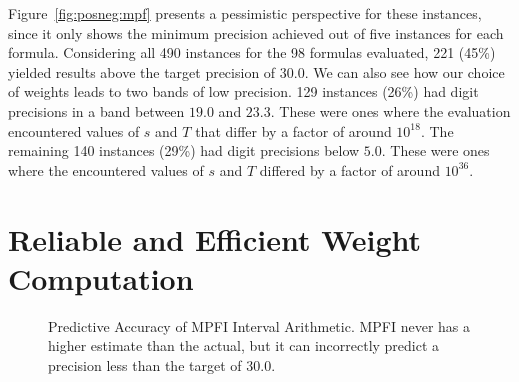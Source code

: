 \documentclass[letterpaper,USenglish,cleveref, autoref, thm-restate]{lipics-v2021}
\begin{document}
Figure~\ref{fig:posneg:mpf} presents a pessimistic
perspective for these instances, since it only shows the minimum
precision achieved out of five instances for each formula.  Considering all 490 instances
for the 98 formulas evaluated, 221 (45\%) yielded results above the
target precision of $30.0$.  We can also see how our choice of weights
leads to two bands of low precision.  129 instances (26\%) had digit
precisions in a band between $19.0$ and $23.3$.  These were ones where
the evaluation encountered values of $s$ and $T$ that
differ by a factor of around $10^{18}$.  The remaining 140 instances
(29\%) had digit precisions below $5.0$.  These were ones where the
encountered values of $s$ and $T$ differed by a factor of around
 $10^{36}$.

\section{Reliable and Efficient Weight Computation}

\begin{figure}
\caption{Predictive Accuracy of MPFI Interval Arithmetic.  MPFI never has a higher estimate than the actual, but it can
incorrectly predict a precision less than the target of 30.0.}
\label{fig:mpfi}
\end{figure}
\end{document}
